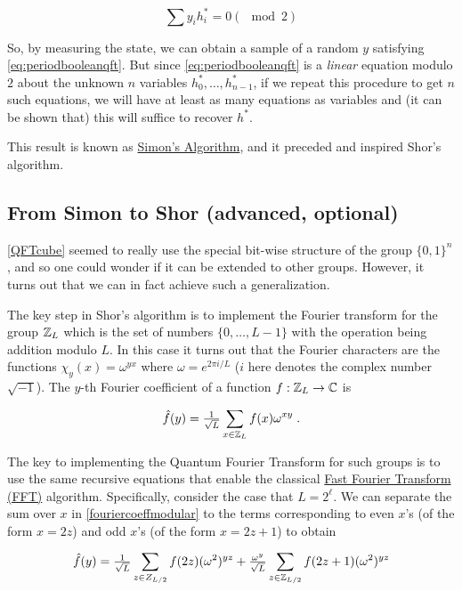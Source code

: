 \[
\sum y_i h^*_i = 0 (\mod 2) \label{eq:periodbooleanqft}
\]

So, by measuring the state, we can obtain a sample of a random \(y\)
satisfying \eqref{eq:periodbooleanqft}. But since
\eqref{eq:periodbooleanqft} is a \emph{linear} equation modulo \(2\)
about the unknown \(n\) variables \(h^*_0,\ldots,h^*_{n-1}\), if we
repeat this procedure to get \(n\) such equations, we will have at least
as many equations as variables and (it can be shown that) this will
suffice to recover \(h^*\).

This result is known as
\href{https://en.wikipedia.org/wiki/Simon\%27s_problem}{Simon's
Algorithm}, and it preceded and inspired Shor's algorithm.

\subsection{From Simon to Shor (advanced,
optional)}\label{From-Simon-to-Shor-advanc}

\cref{QFTcube} seemed to really use the special bit-wise structure of
the group \(\{0,1\}^n\), and so one could wonder if it can be extended
to other groups. However, it turns out that we can in fact achieve such
a generalization.

The key step in Shor's algorithm is to implement the Fourier transform
for the group \({\mathbb{Z}}_L\) which is the set of numbers \(\{0,\ldots,L-1\}\)
with the operation being addition modulo \(L\). In this case it turns
out that the Fourier characters are the functions
\(\chi_y(x) = \omega^{yx}\) where \(\omega = e^{2\pi i/L}\) (\(i\) here
denotes the complex number \(\sqrt{-1}\)). The \(y\)-th Fourier
coefficient of a function \(f:{\mathbb{Z}}_L \rightarrow \mathbb{C}\) is

\[\hat{f}(y) = \tfrac{1}{\sqrt{L}}\sum_{x\in \Z_L} f(x)\omega^{xy} \;. \label{fouriercoeffmodular}\]

The key to implementing the Quantum Fourier Transform for such groups is
to use the same recursive equations that enable the classical
\href{https://en.wikipedia.org/wiki/Fast_Fourier_transform}{Fast Fourier
Transform (FFT)} algorithm. Specifically, consider the case that
\(L=2^\ell\). We can separate the sum over \(x\) in
\eqref{fouriercoeffmodular} to the terms corresponding to even \(x\)'s
(of the form \(x=2z\)) and odd \(x\)'s (of the form \(x=2z+1\)) to
obtain

\[\hat{f}(y) = \tfrac{1}{\sqrt{L}}\sum_{z \in Z_{L/2}} f(2z)(\omega^2)^{yz} + \tfrac{\omega^y}{\sqrt{L}}\sum_{z\in \Z_{L/2}}f(2z+1)(\omega^2)^{yz} \label{eqfftrecurse}
\]

